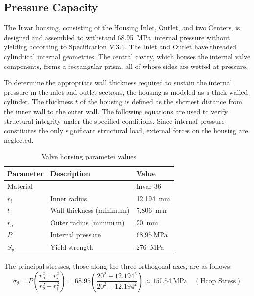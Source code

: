 \documentclass[12pt, letterpaper]{report}%
\newcounter{mycounter}           %
\newcounter{sub}[mycounter]      %
\newcommand{\specPressure}{\SI{68.95}{\mega \pascal}}%
\newcommand{\specref}[1]{\hyperref[tab:specs]{#1}}
\begin{document}
		\subsection{Pressure Capacity}
		\label{subsec:design:just:P}

			The Invar housing, consisting of the Housing Inlet, Outlet, and two Centers, is designed and assembled to withstand \specPressure\ internal pressure without yielding according to Specification \specref{V.3.1}. 
			The Inlet and Outlet have threaded cylindrical internal geometries.
			The central cavity, which houses the internal valve components, forms a rectangular prism, all of whose sides are wetted at pressure.

			To determine the appropriate wall thickness required to sustain the internal pressure in the inlet and outlet sections, the housing is modeled as a thick-walled cylinder.
			The thickness $t$ of the housing is defined as the shortest distance from the inner wall to the outer wall.
			The following equations are used to verify structural integrity under the specified conditions.
			Since internal pressure constitutes the only significant structural load, external forces on the housing are neglected.

			\begin{table}[H]
				\centering
				\caption{Valve housing parameter values}
				\label{tab:housing_parameters}
				\begin{tabularx}{\textwidth}{l X l}
					\toprule
					\textbf{Parameter} & \textbf{Description} & \textbf{Value} \\
					\midrule
					Material &
					&
					Invar 36
					\\\addlinespace
					$r_i$ &
					Inner radius &
					\SI{12.194}{\milli\meter}
					\\\addlinespace
					$t$ &
					Wall thickness (minimum) &
					\SI{7.806}{\milli\meter}
					\\\addlinespace
					$r_o$ &
					Outer radius (minimum) &
					\SI{20}{\milli\meter}
					\\\addlinespace
					$P$ &
					Internal pressure &
					$\specPressure$
					\\\addlinespace
					$S_y$ &
					Yield strength &
					\SI{276}{\mega\pascal}
					\\\bottomrule
				\end{tabularx}
			\end{table}

			The principal stresses, those along the three orthogonal axes, are as follows\cite{ref_shigley}:
			\begin{equation}
			\sigma_{\theta} = P \left( \frac{r_o^2 + r_i^2}{r_o^2 - r_i^2} \right) = 68.95 \left( \frac{20^2 + 12.194^2}{20^2 - 12.194^2} \right) \approx \SI{150.54}{\mega\pascal} \quad (\text{Hoop Stress})
			\end{equation}
\end{document}
